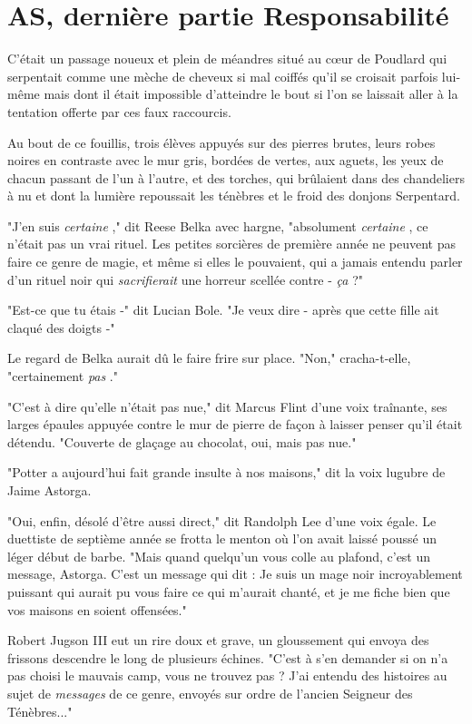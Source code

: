 
\chapter{AS, dernière partie   Responsabilité}

C'était un passage noueux et plein de méandres situé au cœur de Poudlard qui serpentait comme une mèche de cheveux si mal coiffés qu'il se croisait parfois lui-même mais dont il était impossible d'atteindre le bout si l'on se laissait aller à la tentation offerte par ces faux raccourcis.

Au bout de ce fouillis, trois élèves appuyés sur des pierres brutes, leurs robes noires en contraste avec le mur gris, bordées de vertes, aux aguets, les yeux de chacun passant de l'un à l'autre, et des torches, qui brûlaient dans des chandeliers à nu et dont la lumière repoussait les ténèbres et le froid des donjons Serpentard.

"J'en suis \emph{certaine} ," dit Reese Belka avec hargne, "absolument \emph{certaine} , ce n'était pas un vrai rituel. Les petites sorcières de première année ne peuvent pas faire ce genre de magie, et même si elles le pouvaient, qui a jamais entendu parler d'un rituel noir qui \emph{sacrifierait}  une horreur scellée contre - \emph{ça}  ?"

"Est-ce que tu étais -" dit Lucian Bole. "Je veux dire - après que cette fille ait claqué des doigts -"

Le regard de Belka aurait dû le faire frire sur place. "Non," cracha-t-elle, "certainement \emph{pas} ."

"C'est à dire qu'elle n'était pas nue," dit Marcus Flint d'une voix traînante, ses larges épaules appuyée contre le mur de pierre de façon à laisser penser qu'il était détendu. "Couverte de glaçage au chocolat, oui, mais pas nue."

"Potter a aujourd'hui fait grande insulte à nos maisons," dit la voix lugubre de Jaime Astorga.

"Oui, enfin, désolé d'être aussi direct," dit Randolph Lee d'une voix égale. Le duettiste de septième année se frotta le menton où l'on avait laissé poussé un léger début de barbe. "Mais quand quelqu'un vous colle au plafond, c'est un message, Astorga. C'est un message qui dit : Je suis un mage noir incroyablement puissant qui aurait pu vous faire ce qui m'aurait chanté, et je me fiche bien que vos maisons en soient offensées."

Robert Jugson III eut un rire doux et grave, un gloussement qui envoya des frissons descendre le long de plusieurs échines. "C'est à s'en demander si on n'a pas choisi le mauvais camp, vous ne trouvez pas ? J'ai entendu des histoires au sujet de \emph{messages}  de ce genre, envoyés sur ordre de l'ancien Seigneur des Ténèbres..."

